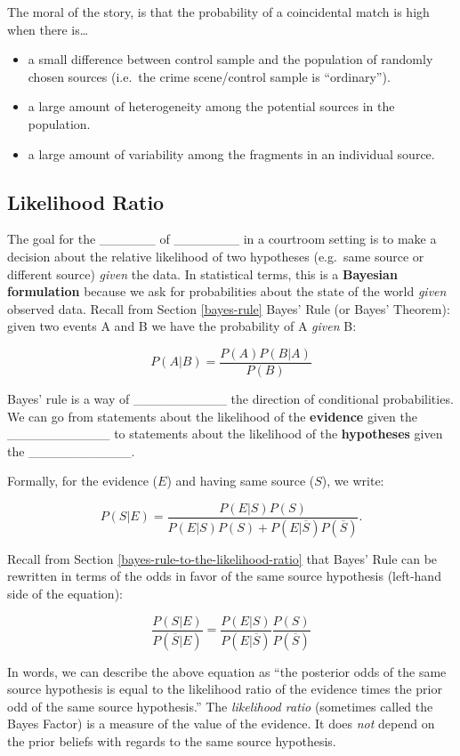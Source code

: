 \documentclass[]{book}
\providecommand{\tightlist}{%
  \setlength{\itemsep}{0pt}\setlength{\parskip}{0pt}}
\theoremstyle{definition}
\theoremstyle{definition}
\theoremstyle{remark}
\begin{document}
The moral of the story, is that the probability of a coincidental match
is high when there is\ldots{}

\begin{itemize}
\tightlist
\item
  a small difference between control sample and the population of
  randomly chosen sources (i.e.~the crime scene/control sample is
  ``ordinary'').
\item
  a large amount of heterogeneity among the potential sources in the
  population.
\item
  a large amount of variability among the fragments in an individual
  source.
\end{itemize}

\subsection{Likelihood Ratio}\label{likelihood-ratio}

The goal for the \_\_\_\_\_\_ of \_\_\_\_\_\_\_ in a courtroom setting
is to make a decision about the relative likelihood of two hypotheses
(e.g.~same source or different source) \emph{given} the data. In
statistical terms, this is a \textbf{Bayesian formulation} because we
ask for probabilities about the state of the world \emph{given} observed
data. Recall from Section \ref{bayes-rule} Bayes' Rule (or Bayes'
Theorem): given two events A and B we have the probability of A
\emph{given} B:

\[P(A|B) = \frac{P(A)P(B|A)}{P(B)}\] \clearpage 

Bayes' rule is a way of \_\_\_\_\_\_\_\_\_\_ the direction of
conditional probabilities. We can go from statements about the
likelihood of the \textbf{evidence} given the \_\_\_\_\_\_\_\_\_\_\_ to
statements about the likelihood of the \textbf{hypotheses} given the
\_\_\_\_\_\_\_\_\_\_\_.

Formally, for the evidence (\(E\)) and having same source (\(S\)), we
write:

\[P(S|E) = \frac{P(E|S)P(S)}{P(E|S)P(S) + P(E|\overline{S})P(\overline{S})}.\]

Recall from Section \ref{bayes-rule-to-the-likelihood-ratio} that Bayes'
Rule can be rewritten in terms of the odds in favor of the same source
hypothesis (left-hand side of the equation):

\[\frac{P(S|E)}{P(\overline{S}|E)} = \frac{P(E|S)}{P(E|\overline{S})}\frac{P(S)}{P(\overline{S})}\]

In words, we can describe the above equation as ``the posterior odds of
the same source hypothesis is equal to the likelihood ratio of the
evidence times the prior odd of the same source hypothesis.'' The
\emph{likelihood ratio} (sometimes called the Bayes Factor) is a measure
of the value of the evidence. It does \emph{not} depend on the prior
beliefs with regards to the same source hypothesis.
\end{document}
